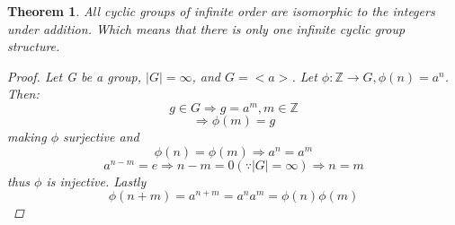 \documentclass[12pt]{article}
\newtheorem{theorem}{Theorem}
\begin{document}
\begin{theorem}
    All cyclic groups of infinite order are isomorphic to the integers under addition. 
    Which means that there is only one infinite cyclic group structure.

    \begin{proof}
        Let G be a group, \(|G| = \infty\), and \(G =<a>\). 
        Let \(\phi: \mathbb Z \to G, \phi(n) = a^n\). Then: 
        \[ 
            g \in G \Rightarrow g = a^m, m\in \mathbb Z 
        \]
        \[ 
            \Rightarrow \phi(m)=g 
        \]
        making \(\phi\) surjective and 
        \[ 
            \phi(n) = \phi(m) \Rightarrow a^n = a^m  
        \]
        \[ 
            a^{n-m} = e \Rightarrow n-m = 0 (\because |G| = \infty)\Rightarrow n = m
        \]
        thus \(\phi\) is injective.
        Lastly 
        \[ 
            \phi(n+m) = a^{n+m} = a^n a^m = \phi(n)\phi(m)
        \]

    \end{proof}

\end{theorem}
\end{document}
